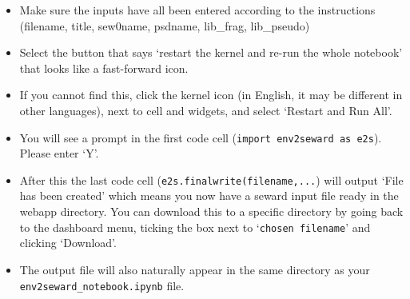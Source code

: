 \documentclass[10pt]{article}
\begin{document}
\begin{itemize}
	\item Make sure the inputs have all been entered according to the instructions (filename, title, sew0name, psdname, lib\_frag, lib\_pseudo)
	\item Select the button that says `restart the kernel and re-run the whole notebook' that looks like a fast-forward icon.
	\item If you cannot find this, click the kernel icon (in English, it may be different in other languages), next to cell and widgets, and select `Restart and Run All'.
	\item You will see a prompt in the first code cell (\texttt{import env2seward as e2s}). Please enter `Y'.
	\item After this the last code cell (\texttt{e2s.finalwrite(filename,...}) will output `File has been created' which means you now have a seward input file ready in the webapp directory. You can download this to a specific directory by going back to the dashboard menu, ticking the box next to `\texttt{chosen filename}' and clicking `Download'.
	\item The output file will also naturally appear in the same directory as your \texttt{env2seward\_notebook.ipynb} file.
\end{itemize}

\end{document}
